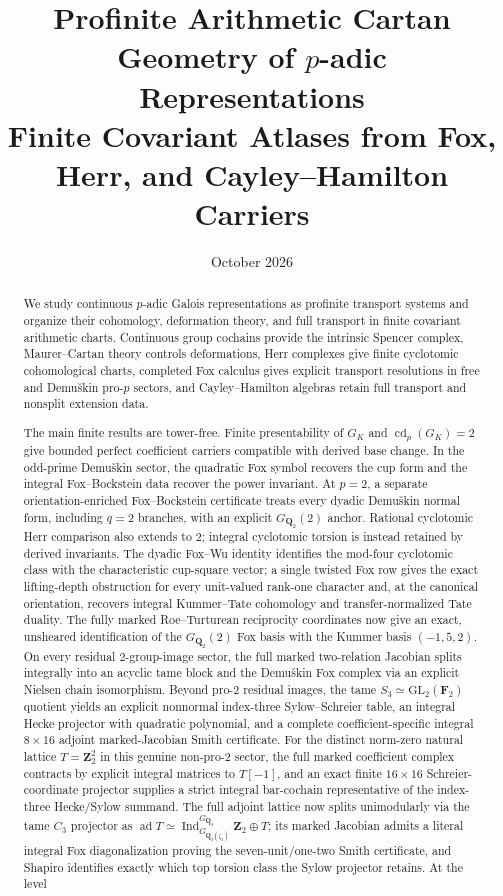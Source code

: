 \documentclass[11pt]{article}
\title{\textbf{Profinite Arithmetic Cartan Geometry of $p$-adic Representations}\\[3pt]
\large Finite Covariant Atlases from Fox, Herr, and Cayley--Hamilton Carriers}
\author{}
\date{October 2026}
\theoremstyle{definition}
\begin{document}
\maketitle

\begin{abstract}
We study continuous $p$-adic Galois representations as profinite transport systems and organize their cohomology, deformation theory, and full transport in finite covariant arithmetic charts.  Continuous group cochains provide the intrinsic Spencer complex, Maurer--Cartan theory controls deformations, Herr complexes give finite cyclotomic cohomological charts, completed Fox calculus gives explicit transport resolutions in free and Demu\v{s}kin pro-$p$ sectors, and Cayley--Hamilton algebras retain full transport and nonsplit extension data.

The main finite results are tower-free.  Finite presentability of $G_K$ and $\operatorname{cd}_p(G_K)=2$ give bounded perfect coefficient carriers compatible with derived base change.  In the odd-prime Demu\v{s}kin sector, the quadratic Fox symbol recovers the cup form and the integral Fox--Bockstein data recover the power invariant.  At $p=2$, a separate orientation-enriched Fox--Bockstein certificate treats every dyadic Demu\v{s}kin normal form, including $q=2$ branches, with an explicit $G_{\mathbf Q_2}(2)$ anchor.  Rational cyclotomic Herr comparison also extends to $2$; integral cyclotomic torsion is instead retained by derived invariants.  The dyadic Fox--Wu identity identifies the mod-four cyclotomic class with the characteristic cup-square vector; a single twisted Fox row gives the exact lifting-depth obstruction for every unit-valued rank-one character and, at the canonical orientation, recovers integral Kummer--Tate cohomology and transfer-normalized Tate duality.  The fully marked Roe--Turturean reciprocity coordinates now give an exact, unsheared identification of the $G_{\mathbf Q_2}(2)$ Fox basis with the Kummer basis $(-1,5,2)$.  On every residual $2$-group-image sector, the full marked two-relation Jacobian splits integrally into an acyclic tame block and the Demu\v{s}kin Fox complex via an explicit Nielsen chain isomorphism.  Beyond pro-$2$ residual images, the tame $S_3\simeq\mathrm{GL}_2(\mathbf F_2)$ quotient yields an explicit nonnormal index-three Sylow--Schreier table, an integral Hecke projector with quadratic polynomial, and a complete coefficient-specific integral $8\times16$ adjoint marked-Jacobian Smith certificate.  For the distinct norm-zero natural lattice $T=\mathbf Z_2^2$ in this genuine non-pro-$2$ sector, the full marked coefficient complex contracts by explicit integral matrices to $T[-1]$, and an exact finite $16\times16$ Schreier-coordinate projector supplies a strict integral bar-cochain representative of the index-three Hecke/Sylow summand.  The full adjoint lattice now splits unimodularly via the tame $C_3$ projector as $\operatorname{ad}T\simeq\operatorname{Ind}_{G_{\mathbf Q_2(\zeta_3)}}^{G_{\mathbf Q_2}}\mathbf Z_2\oplus T$; its marked Jacobian admits a literal integral Fox diagonalization proving the seven-unit/one-two Smith certificate, and Shapiro identifies exactly which top torsion class the Sylow projector retains.  At the level 
\end{abstract}
\end{document}
